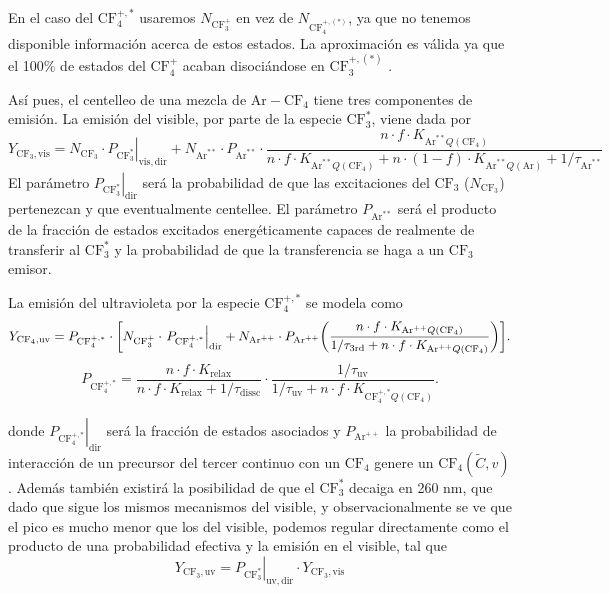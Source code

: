\documentclass[12pt,a4paper]{article}
\newcommand{\Ar}{\mathrm{Ar}}
\newcommand{\CF}{\mathrm{CF}}
\newcommand{\vis}{\mathrm{vis}}
\newcommand{\uv}{\mathrm{uv}}
\newcommand{\third}{\mathrm{3rd}}
\newcommand{\dir}{\mathrm{dir}}
\begin{document}
En el caso del ${\CF_4^{+,*}}$ usaremos $N_{\CF_3^{+}}$ en vez de $N_{\CF_4^{+,(*)}}$, ya que no tenemos disponible información acerca de estos estados. La aproximación es válida ya que el 100\% de estados del $\CF_4^{+}$ acaban disociándose en $\CF_3^{+,(*)}$ \cite{zhang1989excitation}. 

Así pues, el centelleo de una mezcla de $\Ar-\CF_4$ tiene tres componentes de emisión. La emisión del visible, por parte de la especie $\CF_3^*$, viene dada por
\begin{equation}
    Y_{\CF_3,\vis}
    =
    N_{\CF_3}\cdot \left. P_{\CF_3^*}\right|_{\vis,\dir}
    +
    N_{\Ar^{**}} \cdot P_{\Ar^{**}}
    \cdot
    \frac{n \cdot f \cdot K_{\Ar^{**}Q(\CF_4)}}{
    n \cdot f \cdot K_{\Ar^{**}Q(\CF_4)}
    +
    n \cdot (1-f) \cdot K_{\Ar^{**}Q(\Ar)}
    +
    1/\tau_{\Ar^{**}}} \label{eq:YvisCF3}
\end{equation} 
El parámetro $\left. P_{\CF_3^*}\right|_{\dir}$ será la probabilidad de que las excitaciones del $\CF_3$ ($N_{\CF_3}$) pertenezcan y que eventualmente centellee. El parámetro $P_{\Ar^{**}}$ será el producto de la fracción de estados excitados energéticamente capaces de realmente de transferir al $\CF_3^*$ y la probabilidad de que la transferencia se haga a un $\CF_3$ emisor.

La emisión del ultravioleta por la especie $\CF_4^{+,*}$ se modela como
\begin{equation}
    Y_{\CF_4,\uv}
    =
    P_{\CF_4^{+,*}}
    \cdot
    \bqty{
      N_{\CF_3^+}\cdot \left. P_{\CF_4^{+,*}} \right|_{\dir}
      +
      N_{\Ar^{++}}\cdot P_{\Ar^{++}}
      \pqty{
        \frac{n \cdot f \cdot K_{\Ar^{++}Q(\CF_4)}}{
        1/\tau_{\third} + n \cdot f \cdot K_{\Ar^{++}Q(\CF_4)}}
      }
    }. \label{eq:YuvCF4}
\end{equation} 
\begin{equation}
    P_{\CF_4^{+,*}}
    =
    \frac{n \cdot f \cdot K_{\text{relax}}}{
    n \cdot f \cdot K_{\text{relax}} + 1/\tau_{\text{dissc}}}
    \cdot
    \frac{1/\tau_{\uv}}{
    1/\tau_{\uv} + n \cdot f \cdot K_{\CF_4^{+,*}Q(\CF_4)}}.
\end{equation} 

donde $\left. P_{\CF_4^{+,*}} \right|_{\dir}$ será la fracción de estados asociados y $P_{\Ar^{++}}$ la probabilidad de interacción de un precursor del tercer continuo con un $\CF_4$ genere un $\CF_4(\tilde{C},v)$. Además también existirá la posibilidad de que el $\CF_3^*$ decaiga en 260 nm, que dado que sigue los mismos mecanismos del visible, y observacionalmente se ve que el pico es mucho menor que los del visible, podemos regular directamente como el producto de una probabilidad efectiva y la emisión en el visible, tal que
\begin{equation}
    Y_{\CF_3,\uv}
    = \left. P_{\CF_3^*}\right|_{\uv,\dir} \cdot 
    Y_{\CF_3,\vis}     \label{eq:YuvCF3}
\end{equation} 
\end{document}

